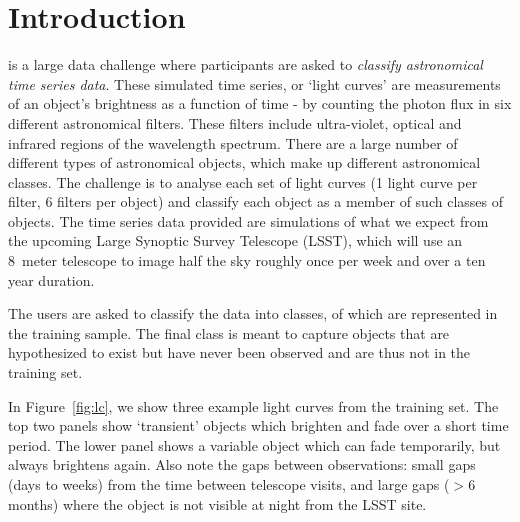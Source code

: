 %

%
\section{Introduction}

\label{sec:intro}
{\plasticc} is a large data challenge where participants are asked to \textit{classify astronomical time series data}. These simulated time series, or `light curves' are measurements of an object's brightness as a function of time - by counting the photon flux in six different astronomical filters. These filters include ultra-violet, optical and infrared regions of the wavelength spectrum. There are a large number of different types of astronomical objects, which make up different astronomical classes. The challenge is to analyse each set of light curves (1 light curve per filter, 6 filters per object) and classify each object as a member of such classes of objects. The time series data provided are simulations of what we expect from the upcoming Large Synoptic Survey Telescope (LSST), which will use an 8~meter telescope to image half the sky roughly once per week and over a ten year duration.

The users are asked to classify the data into {\numTotalClasses} classes,
{\numClasses} of which are represented in the training sample. The final class is meant to capture objects that are hypothesized to exist but have never been observed and are thus not in the training set.




In Figure~\ref{fig:lc}, we show three example light curves from the training set. The top two panels show `transient' objects which brighten and fade over a short time period. 
The lower panel shows a variable object which can fade temporarily, but always brightens again. Also note the gaps between observations: small gaps (days to weeks) from the time between telescope visits, and large gaps ($>6$ months) where the object is not visible at night from the LSST site.

